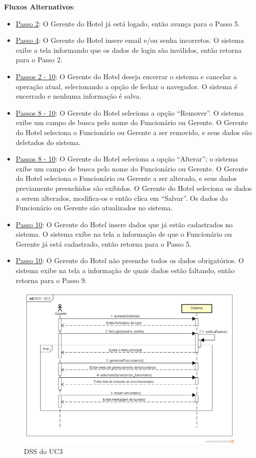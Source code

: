 \documentclass[notitlepage]{article}
\begin{document}
\textbf{Fluxos Alternativos}:\\
\begin{itemize}
\item \underline{Passo 2}: O Gerente do Hotel já está logado, então avança para o Passo 5.
\item \underline{Passo 4}: O Gerente do Hotel insere email e/ou senha incorretos. O sistema exibe a tela informando que os dados de login são inválidos, então retorna para o Passo 2.
\item \underline{Passos 2 - 10}: O Gerente do Hotel deseja encerrar o sistema e cancelar a operação atual, selecionando a opção de fechar o navegador. O sistema é encerrado e nenhuma informação é salva.  
\item \underline{Passos 8 - 10}: O Gerente do Hotel seleciona a opção “Remover”. O sistema exibe um campo de busca pelo nome do Funcionário ou Gerente. O Gerente do Hotel seleciona o Funcionário ou Gerente a ser removido, e seus dados são deletados do sistema.    
\item \underline{Passos 8 - 10}: O Gerente do Hotel seleciona a opção “Alterar”; o sistema exibe um campo de busca pelo nome do Funcionário ou Gerente. O Gerente do Hotel seleciona o Funcionário ou Gerente a ser alterado, e seus dados previamente preenchidos são exibidos. O Gerente do Hotel seleciona os dados a serem alterados, modifica-os e então clica em “Salvar”. Os dados do Funcionário ou Gerente são atualizados no sistema.
\item \underline{Passo 10}: O Gerente do Hotel insere dados que já estão cadastrados no sistema. O sistema exibe na tela a informação de que o Funcionário ou Gerente já está cadastrado, então retorna para o Passo 5.
\item \underline{Passo 10}: O Gerente do Hotel não preenche todos os dados obrigatórios. O sistema exibe na tela a informação de quais dados estão faltando, então retorna para o Passo 9.

\end{itemize}

\begin{figure}[!htbp]
	\centering
  \includegraphics[scale=0.65]{UC3.png}
  \caption{DSS do UC3}
  \label{fig:UC3}
\end{figure}
\end{document}
